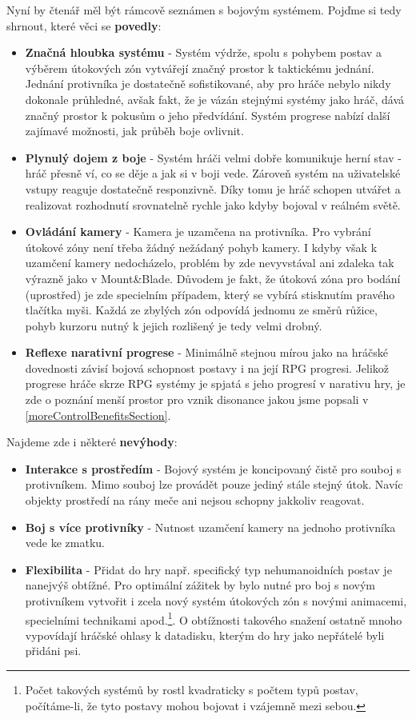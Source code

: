 Nyní by čtenář měl být rámcově seznámen s bojovým systémem. Pojďme si tedy shrnout, které věci se \textbf{povedly}:

\begin{itemize}
    \item \textbf{Značná hloubka systému} - Systém výdrže, spolu s pohybem postav a výběrem útokových zón vytvářejí značný prostor k taktickému jednání. Jednání protivníka je dostatečně sofistikované, aby pro hráče nebylo nikdy dokonale průhledné, avšak fakt, že je vázán stejnými systémy jako hráč, dává značný prostor k pokusům o jeho předvídání. Systém progrese nabízí další zajímavé možnosti, jak průběh boje ovlivnit. 
    \item \textbf{Plynulý dojem z boje} - Systém hráči velmi dobře komunikuje herní stav - hráč přesně ví, co se děje a jak si v boji vede. Zároveň systém na uživatelské vstupy reaguje dostatečně responzivně. Díky tomu je hráč schopen utvářet a realizovat rozhodnutí srovnatelně rychle jako kdyby bojoval v reálném světě.
    \item \textbf{Ovládání kamery} - Kamera je uzamčena na protivníka. Pro vybrání útokové zóny není třeba žádný nežádaný pohyb kamery. I kdyby však k uzamčení kamery nedocházelo, problém by zde nevyvstával ani zdaleka tak výrazně jako v Mount\&Blade. Důvodem je fakt, že útoková zóna pro bodání (uprostřed) je zde specielním případem, který se vybírá stisknutím pravého tlačítka myši. Každá ze zbylých zón odpovídá jednomu ze směrů růžice, pohyb kurzoru nutný k jejich rozlišený je tedy velmi drobný. 
    \item \textbf{Reflexe narativní progrese} - Minimálně stejnou mírou jako na hráčské dovednosti závisí bojová schopnost postavy i na její \acs{RPG} progresi. Jelikož progrese hráče skrze \acs{RPG} systémy je spjatá s jeho progresí v narativu hry, je zde o poznání menší prostor pro vznik disonance jakou jsme popsali v \ref{moreControlBenefitsSection}.
\end{itemize}

Najdeme zde i některé \textbf{nevýhody}:
\begin{itemize}
    \item \textbf{Interakce s prostředím} - Bojový systém je koncipovaný čistě pro souboj s protivníkem. Mimo souboj lze provádět pouze jediný stále stejný útok. Navíc objekty prostředí na rány meče ani nejsou schopny jakkoliv reagovat.  
    \item \textbf{Boj s více protivníky} - Nutnost uzamčení kamery na jednoho protivníka vede ke zmatku.
    \item \textbf{Flexibilita} - Přidat do hry např. specifický typ nehumanoidních postav je nanejvýš obtížné. Pro optimální zážitek by bylo nutné pro boj s novým protivníkem vytvořit i zcela nový systém útokových zón s novými animacemi, specielními technikami apod.\footnote{Počet takových systémů by rostl kvadraticky s počtem typů postav, počítáme-li, že tyto postavy mohou bojovat i vzájemně mezi sebou.}. O obtížnosti takového snažení ostatně mnoho vypovídají hráčské ohlasy k datadisku, kterým do hry jako nepřátelé byli přidáni psi.  
\end{itemize}

